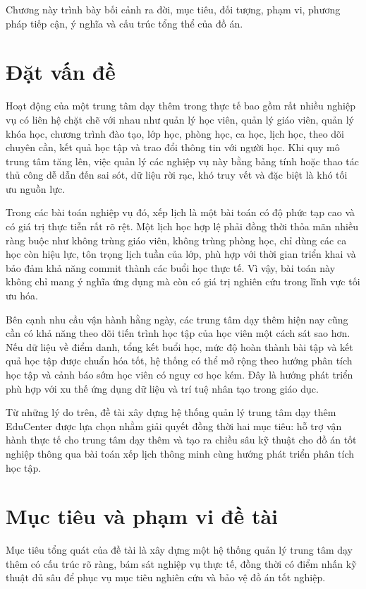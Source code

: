 \documentclass[../DoAn.tex]{subfiles}
\begin{document}
Chương này trình bày bối cảnh ra đời, mục tiêu, đối tượng, phạm vi, phương pháp tiếp cận, ý nghĩa và cấu trúc tổng thể của đồ án.

\section{Đặt vấn đề}
\label{section:1.1}
Hoạt động của một trung tâm dạy thêm trong thực tế bao gồm rất nhiều nghiệp vụ có liên hệ chặt chẽ với nhau như quản lý học viên, quản lý giáo viên, quản lý khóa học, chương trình đào tạo, lớp học, phòng học, ca học, lịch học, theo dõi chuyên cần, kết quả học tập và trao đổi thông tin với người học. Khi quy mô trung tâm tăng lên, việc quản lý các nghiệp vụ này bằng bảng tính hoặc thao tác thủ công dễ dẫn đến sai sót, dữ liệu rời rạc, khó truy vết và đặc biệt là khó tối ưu nguồn lực.

Trong các bài toán nghiệp vụ đó, xếp lịch là một bài toán có độ phức tạp cao và có giá trị thực tiễn rất rõ rệt. Một lịch học hợp lệ phải đồng thời thỏa mãn nhiều ràng buộc như không trùng giáo viên, không trùng phòng học, chỉ dùng các ca học còn hiệu lực, tôn trọng lịch tuần của lớp, phù hợp với thời gian triển khai và bảo đảm khả năng commit thành các buổi học thực tế. Vì vậy, bài toán này không chỉ mang ý nghĩa ứng dụng mà còn có giá trị nghiên cứu trong lĩnh vực tối ưu hóa.

Bên cạnh nhu cầu vận hành hằng ngày, các trung tâm dạy thêm hiện nay cũng cần có khả năng theo dõi tiến trình học tập của học viên một cách sát sao hơn. Nếu dữ liệu về điểm danh, tổng kết buổi học, mức độ hoàn thành bài tập và kết quả học tập được chuẩn hóa tốt, hệ thống có thể mở rộng theo hướng phân tích học tập và cảnh báo sớm học viên có nguy cơ học kém. Đây là hướng phát triển phù hợp với xu thế ứng dụng dữ liệu và trí tuệ nhân tạo trong giáo dục.

Từ những lý do trên, đề tài xây dựng hệ thống quản lý trung tâm dạy thêm EduCenter được lựa chọn nhằm giải quyết đồng thời hai mục tiêu: hỗ trợ vận hành thực tế cho trung tâm dạy thêm và tạo ra chiều sâu kỹ thuật cho đồ án tốt nghiệp thông qua bài toán xếp lịch thông minh cùng hướng phát triển phân tích học tập.

\section{Mục tiêu và phạm vi đề tài}
\label{section:1.2}
Mục tiêu tổng quát của đề tài là xây dựng một hệ thống quản lý trung tâm dạy thêm có cấu trúc rõ ràng, bám sát nghiệp vụ thực tế, đồng thời có điểm nhấn kỹ thuật đủ sâu để phục vụ mục tiêu nghiên cứu và bảo vệ đồ án tốt nghiệp.
\end{document}
